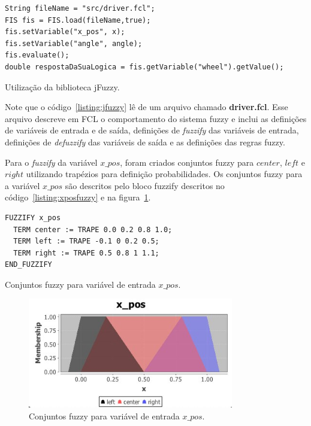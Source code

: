 \documentclass[12pt, a4paper]{article}
\begin{document}
\begin{listing}[h!]
  \begin{verbatim}
String fileName = "src/driver.fcl";
FIS fis = FIS.load(fileName,true);
fis.setVariable("x_pos", x);
fis.setVariable("angle", angle);
fis.evaluate();
double respostaDaSuaLogica = fis.getVariable("wheel").getValue();
  \end{verbatim}
  \caption{Utilização da biblioteca jFuzzy.}\label{listing:jfuzzy}
\end{listing}

Note que o código~\ref{listing:jfuzzy} lê de um arquivo chamado \textbf{driver.fcl}.
Esse arquivo descreve em FCL o comportamento do sistema fuzzy e inclui as definições
de variáveis de entrada e de saída, definições de \textit{fuzzify} das variáveis de entrada,
definições de \textit{defuzzify} das variáveis de saída e as definições das regras fuzzy.

Para o \textit{fuzzify} da variável $x\_pos$, foram criados conjuntos fuzzy para $center$, $left$ e $right$ utilizando trapézios para definição probabilidades.
Os conjuntos fuzzy para a variável $x\_pos$ são descritos pelo bloco fuzzify descritos no código~\ref{listing:xposfuzzy} e na figura~\ref{figure:xposfuzzy}.

\begin{listing}[h!]
  \begin{verbatim}
FUZZIFY x_pos
  TERM center := TRAPE 0.0 0.2 0.8 1.0;
  TERM left := TRAPE -0.1 0 0.2 0.5;
  TERM right := TRAPE 0.5 0.8 1 1.1;
END_FUZZIFY
\end{verbatim}
  \caption{Conjuntos fuzzy para variável de entrada $x\_pos$.}\label{listing:xposfuzzy}
\end{listing}

\begin{figure}[h!]
  \centering
  \includegraphics[width=0.8\textwidth]{assets/x_pos.jpg}
  \caption{Conjuntos fuzzy para variável de entrada $x\_pos$.}\label{figure:xposfuzzy}
\end{figure}
\end{document}
